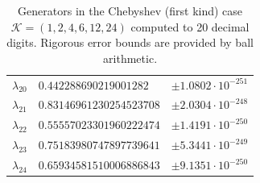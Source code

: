 \documentclass[a4paper,10pt]{article}
\begin{document}
\begin{appendix}
\begin{table}
\begin{tabular}{|l|ll|}
  $\lambda_{20}$ & $0.442288690219001282$    &  $\pm 1.0802 \cdot 10^{-251}$ \\
  $\lambda_{21}$ & $0.83146961230254523708$  &  $\pm 2.0304 \cdot 10^{-248}$ \\
  $\lambda_{22}$ & $0.55557023301960222474$  &  $\pm 1.4191 \cdot 10^{-250}$ \\
  $\lambda_{23}$ & $0.75183980747897739641$  &  $\pm 5.3441 \cdot 10^{-249}$ \\
  $\lambda_{24}$ & $0.65934581510006886843$  &  $\pm 9.1351 \cdot 10^{-250}$ \\
  \hline
  \end{tabular}
  \caption{Generators in the Chebyshev (first kind) case $\mathcal{K} = (1, 2, 4, 6, 12, 24)$
  computed to 20 decimal digits. Rigorous error bounds are provided by ball
  arithmetic.}
\end{table}


\end{appendix}
\end{document}
